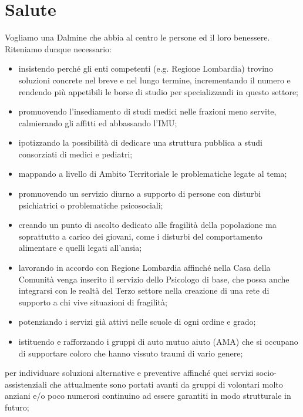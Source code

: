 \section{Salute}
Vogliamo una Dalmine che abbia al centro le persone ed il loro benessere. Riteniamo dunque necessario:

\begin{itemize}
  \item insistendo perché gli enti competenti (e.g. Regione Lombardia) trovino soluzioni concrete nel breve e nel lungo termine, incrementando il numero e rendendo più appetibili le borse di studio per specializzandi in questo settore;
  \item promuovendo l'insediamento di studi medici nelle frazioni meno servite, calmierando gli affitti ed abbassando l'IMU;
  \item ipotizzando la possibilità di dedicare una struttura pubblica a studi consorziati di medici e pediatri;
\end{itemize}

\begin{itemize}
  \item mappando a livello di Ambito Territoriale le problematiche legate al tema;
  \item promuovendo un servizio diurno a supporto di persone con disturbi psichiatrici o problematiche psicosociali;
  \item creando un punto di ascolto dedicato alle fragilità della popolazione ma soprattutto a carico dei giovani, come i disturbi del comportamento alimentare e quelli legati all'ansia;
  \item lavorando in accordo con Regione Lombardia affinché nella Casa della Comunità venga inserito il servizio dello Psicologo di base, che possa anche integrarsi con le realtà del Terzo settore nella creazione di una rete di supporto a chi vive situazioni di fragilità;
  \item potenziando i servizi già attivi nelle scuole di ogni ordine e grado;
  \item istituendo e rafforzando i gruppi di auto mutuo aiuto (AMA) che si occupano di supportare coloro che hanno vissuto traumi di vario genere;
\end{itemize}

 per individuare soluzioni alternative e preventive affinché quei servizi socio-assistenziali che attualmente sono portati avanti da gruppi di volontari molto anziani e/o poco numerosi continuino ad essere garantiti in modo strutturale in futuro;

